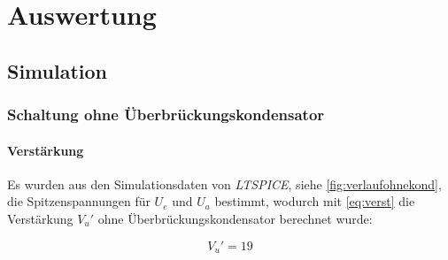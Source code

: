 \documentclass[12pt,english,ngerman]{scrartcl}
\begin{document}
\section{Auswertung}\label{sec:Auswertung}

\subsection{Simulation}

\subsubsection{Schaltung ohne Überbrückungskondensator}


\paragraph{Verstärkung}

Es wurden aus den Simulationsdaten von \textit{LTSPICE}, siehe
\autoref{fig:verlaufohnekond}, die Spitzenspannungen für $U_e$ und $U_a$
bestimmt, wodurch mit \autoref{eq:verst} die Verstärkung $V_{u}'$ ohne Überbrückungskondensator berechnet wurde:

\begin{equation}
  V_{u}' = 19
  \label{eq:sim_verst_ohne}
\end{equation}



\end{document}
